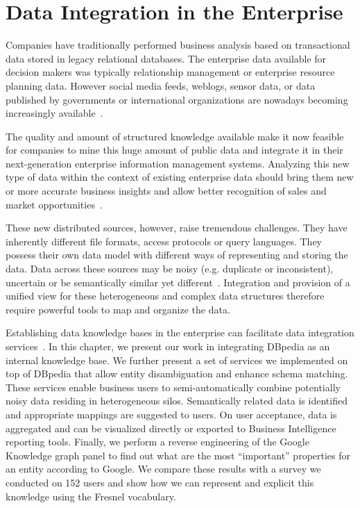 \chapter{Data Integration in the Enterprise}\label{chapter:rubix}
\graphicspath{{Part2/Chapter1/figures/}}

Companies have traditionally performed business analysis based on transactional data stored in legacy relational databases. The enterprise data available for decision makers was typically relationship management or enterprise resource planning data. However social media feeds, weblogs, sensor data, or data published by governments or international organizations are nowadays becoming increasingly available~\cite{Boyd:Article:11}.

The quality and amount of structured knowledge available make it now feasible for companies to mine this huge amount of public data and integrate it in their next-generation enterprise information management systems. Analyzing this new type of data within the context of existing enterprise data should bring them new or more accurate business insights and allow better recognition of sales and market opportunities~\cite{LaValle:MIT:11}.

These new distributed sources, however, raise tremendous challenges. They have inherently different file formats, access protocols or query languages. They possess their own data model with different ways of representing and storing the data. Data across these sources may be noisy (e.g. duplicate or inconsistent), uncertain or be semantically similar yet different~\cite{Avitha:EuroJorunal:11}. Integration and provision of a unified view for these heterogeneous and complex data structures therefore require powerful tools to map and organize the data.

Establishing data knowledge bases in the enterprise can facilitate data integration services~\cite{Frischmuth:SemWebJorunal:12}. In this chapter, we present our work in integrating DBpedia as an internal knowledge base. We further present a set of services we implemented on top of DBpedia that allow entity disambiguation and enhance schema matching. These services enable business users to semi-automatically combine potentially noisy data residing in heterogeneous silos. Semantically related data is identified and appropriate mappings are suggested to users. On user acceptance, data is aggregated and can be visualized directly or exported to Business Intelligence reporting tools. Finally, we perform a reverse engineering of the Google Knowledge graph panel to find out what are the most ``important'' properties for an entity according to Google. We compare these results with a survey we conducted on 152 users and show how we can represent and explicit this knowledge using the Fresnel vocabulary.

